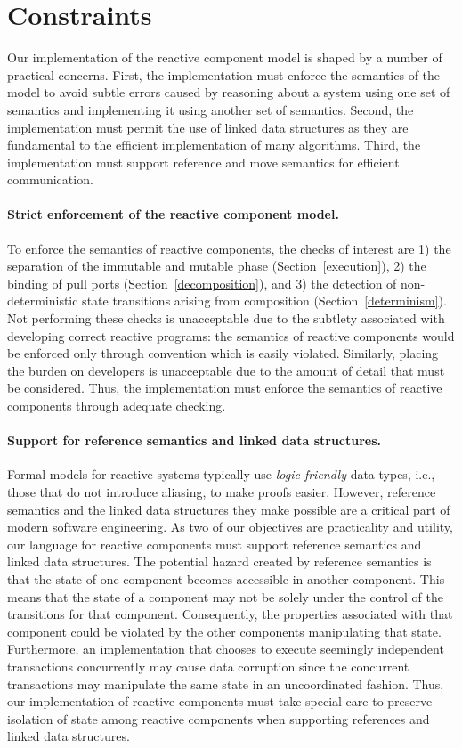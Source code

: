 \section{Constraints}

Our implementation of the reactive component model is shaped by a number of practical concerns.
First, the implementation must enforce the semantics of the model to avoid subtle errors caused by reasoning about a system using one set of semantics and implementing it using another set of semantics.
Second, the implementation must permit the use of linked data structures as they are fundamental to the efficient implementation of many algorithms.
Third, the implementation must support reference and move semantics for efficient communication.

\paragraph{Strict enforcement of the reactive component model.}
To enforce the semantics of reactive components, the checks of interest are 1) the separation of the immutable and mutable phase (Section~\ref{execution}), 2) the binding of pull ports (Section~\ref{decomposition}), and 3) the detection of non-deterministic state transitions arising from composition (Section~\ref{determinism}).
Not performing these checks is unacceptable due to the subtlety associated with developing correct reactive programs:  the semantics of reactive components would be enforced only through convention which is easily violated.
Similarly, placing the burden on developers is unacceptable due to the amount of detail that must be considered.
Thus, the implementation must enforce the semantics of reactive components through adequate checking.

\paragraph{Support for reference semantics and linked data structures.}
Formal models for reactive systems typically use \emph{logic friendly} data-types, i.e., those that do not introduce aliasing, to make proofs easier.
However, reference semantics and the linked data structures they make possible are a critical part of modern software engineering.
As two of our objectives are practicality and utility, our language for reactive components must support reference semantics and linked data structures.
The potential hazard created by reference semantics is that the state of one component becomes accessible in another component.
This means that the state of a component may not be solely under the control of the transitions for that component.
Consequently, the properties associated with that component could be violated by the other components manipulating that state.
Furthermore, an implementation that chooses to execute seemingly independent transactions concurrently may cause data corruption since the concurrent transactions may manipulate the same state in an uncoordinated fashion.
Thus, our implementation of reactive components must take special care to preserve isolation of state among reactive components when supporting references and linked data structures.

